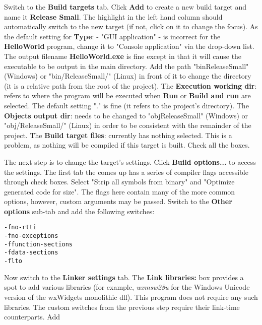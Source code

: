 
Switch to the \textbf{Build targets} tab. Click \textbf{Add} to create a new build target and name it \textbf{Release Small}. The highlight in the left hand column should automatically switch to the new target (if not, click on it to change the focus). As the default setting for \textbf{Type}: - "GUI application" - is incorrect for the \textbf{HelloWorld} program, change it to "Console application" via the drop-down list. The output filename \textbf{HelloWorld.exe} is fine except in that it will cause the executable to be output in the main directory. Add the path "bin\osp ReleaseSmall\osp " (Windows) or "bin/ReleaseSmall/" (Linux) in front of it to change the directory (it is a relative path from the root of the project). The \textbf{Execution working dir}: refers to where the program will be executed when \textbf{Run} or \textbf{Build and run} are selected. The default setting "." is fine (it refers to the project's directory). The \textbf{Objects output dir}: needs to be changed to "obj\osp ReleaseSmall\osp" (Windows) or "obj/ReleaseSmall/" (Linux) in order to be consistent with the remainder of the project. The \textbf{Build target files}: currently has nothing selected. This is a problem, as nothing will be compiled if this target is built. Check all the boxes. 


The next step is to change the target's settings. Click \textbf{Build options...} to access the settings. The first tab the comes up has a series of compiler flags accessible through check boxes. Select "Strip all symbols from binary" and "Optimize generated code for size". The flags here contain many of the more common options, however, custom arguments may be passed. Switch to the \textbf{Other options} sub-tab and add the following switches:

\begin{lstlisting}
-fno-rtti
-fno-exceptions
-ffunction-sections
-fdata-sections
-flto
\end{lstlisting}

Now switch to the \textbf{Linker settings} tab. The \textbf{Link libraries:} box provides a spot to add various libraries (for example, \textit{wxmsw28u} for the Windows Unicode version of the wxWidgets monolithic dll). This program does not require any such libraries. The custom switches from the previous step require their link-time counterparts. Add

